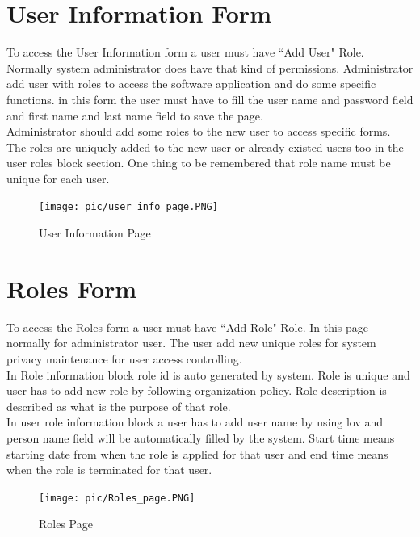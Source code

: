 \documentclass[12pt]{report} %
\begin{document}
\section{User Information Form}
To access the User Information form a user must have ``Add User" Role. Normally system administrator does have that kind of permissions. Administrator add user with roles to access the software application and do some specific functions. in this form the user must have to fill the user name and password field and first name and last name field to save the page.\\
Administrator should add some roles to the new user to access specific forms. The roles are uniquely added to the new user or already existed users too in the user roles block section. One thing to be remembered that role name must be unique for each user. %
\begin{figure}[h]
	\begin{center}
		\texttt{[image: pic/user\_info\_page.PNG]}
	\end{center}
	\caption{User Information Page}
	\label{fig:user_info_page}
\end{figure}

\clearpage




\section{Roles Form}
To access the Roles form a user must have ``Add Role" Role. In this page normally for administrator user. The user add new unique roles for system privacy maintenance for user access controlling.\\
In Role information block role id is auto generated by system. Role is unique and user has to add new role by following organization policy. Role description is described as what is the purpose of that role.\\
In user role information block a user has to add user name by using lov and person name field will be automatically filled by the system. Start time means starting date from when the role is applied for that user and end time means when the role is terminated for that user. 
\begin{figure}[h]
	\begin{center}
	\texttt{[image: pic/Roles\_page.PNG]}
	\end{center}
	\caption{Roles Page}
	\label{fig:Roles_page}
\end{figure}
\clearpage
\end{document}
